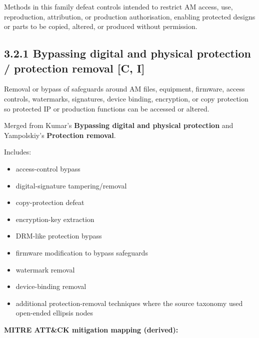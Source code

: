 \documentclass[10pt,a4paper,oneside]{report}
\begin{document}
Methods in this family defeat controls intended to restrict AM access, use, reproduction, attribution, or production authorisation, enabling protected designs or parts to be copied, altered, or produced without permission.


\subsection{3.2.1 Bypassing digital and physical protection / protection removal [C, I]}


Removal or bypass of safeguards around AM files, equipment, firmware, access controls, watermarks, signatures, device binding, encryption, or copy protection so protected IP or production functions can be accessed or altered.

Merged from Kumar's \textbf{Bypassing digital and physical protection} and Yampolskiy's \textbf{Protection removal}.

Includes:

\begin{itemize}
\item access-control bypass
\item digital-signature tampering/removal
\item copy-protection defeat
\item encryption-key extraction
\item DRM-like protection bypass
\item firmware modification to bypass safeguards
\item watermark removal
\item device-binding removal
\item additional protection-removal techniques where the source taxonomy used open-ended ellipsis nodes
\end{itemize}

\textbf{MITRE ATT\&CK mitigation mapping (derived):}
\end{document}
